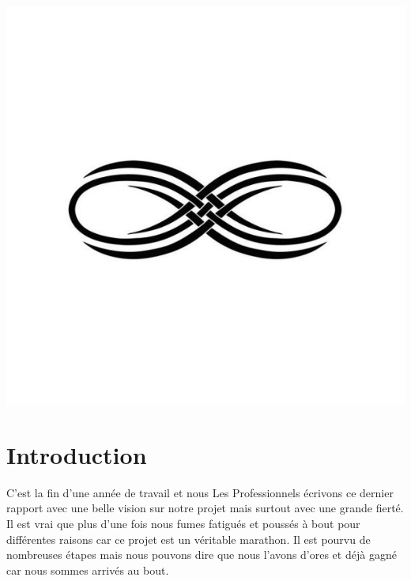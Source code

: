 \documentclass[12pt]{article}
\begin{document}
\begin{center}
\includegraphics[scale=00.20]{infini}
\end{center}


\setlength{\headheight}{13pt} %
\setlength{\headsep}{2.5cm} %
\setlength{\footskip}{2.5cm}



\setcounter{tocdepth}{2} 

\newpage
\thispagestyle{empty}
\pagestyle{fancyplain} \chead{} 
\tableofcontents

\newpage

\section{Introduction}

C’est la fin d’une année de travail et nous Les Professionnels écrivons ce dernier rapport avec une belle vision sur notre projet mais surtout avec une grande fierté. Il est vrai que plus d’une fois nous fumes fatigués et poussés à bout pour différentes raisons car ce projet est un véritable marathon. Il est pourvu de nombreuses étapes mais nous pouvons dire que nous l’avons d’ores et déjà gagné car nous sommes arrivés au bout.\\
\end{document}
